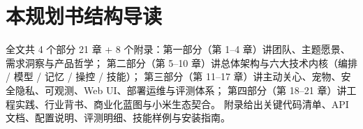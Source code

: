 \section*{本规划书结构导读}
全文共 4 个部分 21 章 + 8 个附录：第一部分（第 1--4 章）讲团队、主题愿景、需求洞察与产品哲学；
第二部分（第 5--10 章）讲总体架构与六大技术内核（编排 / 模型 / 记忆 / 操控 / 技能）；
第三部分（第 11--17 章）讲主动关心、宠物、安全隐私、可观测、Web UI、部署运维与评测体系；
第四部分（第 18--21 章）讲工程实践、行业背书、商业化蓝图与小米生态契合。
附录给出关键代码清单、API 文档、配置说明、评测明细、技能样例与安装指南。
